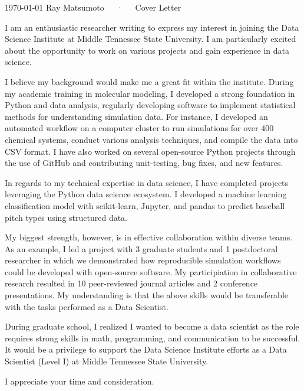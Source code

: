 \documentclass[11pt, a4paper]{awesome-cv}
\begin{document}
\makecvheader[R]

\makecvfooter
  {\today}
  {Ray Matsumoto~~~·~~~Cover Letter}
  {}

\makelettertitle

\begin{cvletter}

I am an enthusiastic researcher writing to express my interest in
    joining the Data Science Institute at Middle Tennessee State University.
    I am particularly excited about the opportunity to work on various projects
    and gain experience in data science.

    I believe my background would make me a great fit within the institute.  During my
    academic training in molecular modeling, I developed a strong foundation in
    Python and data analysis, regularly developing software to implement
    statistical methods for understanding simulation data.  
    For instance, I developed an automated workflow on a computer cluster to run simulations for over 
    400 chemical systems, conduct various analysis techniques, and compile the data into CSV format.  
    I have also worked on several open-source Python
    projects through the use of GitHub and contributing unit-testing, bug fixes,
    and new features.

    In regards to my technical expertise in data science, I have completed
     projects leveraging the Python data science ecosystem.  I developed
    a machine learning classification model with scikit-learn, Jupyter, and
    pandas to predict baseball pitch types using structured data.  

    My biggest strength, however, is in effective collaboration within diverse
    teams.  As an example, I led a project with 3 graduate students and 1
    postdoctoral researcher in which we demonstrated how reproducible simulation workflows could be
    developed with open-source software.  My participiation in collaborative
    research resulted in 10 peer-reviewed journal articles and 2 conference presentations.
    My understanding is that the above skills would be
    transferable with the tasks performed as a Data Scientist.

    During graduate school, I realized I wanted to become a data scientist as the role requires strong skills in math, programming, and communication to be successful.
    It would be a privilege to support the Data Science Institute efforts as a
    Data Scientist (Level I) at Middle Tennessee State University.

    I appreciate your time and consideration.


\end{cvletter}


\makeletterclosing
\end{document}
